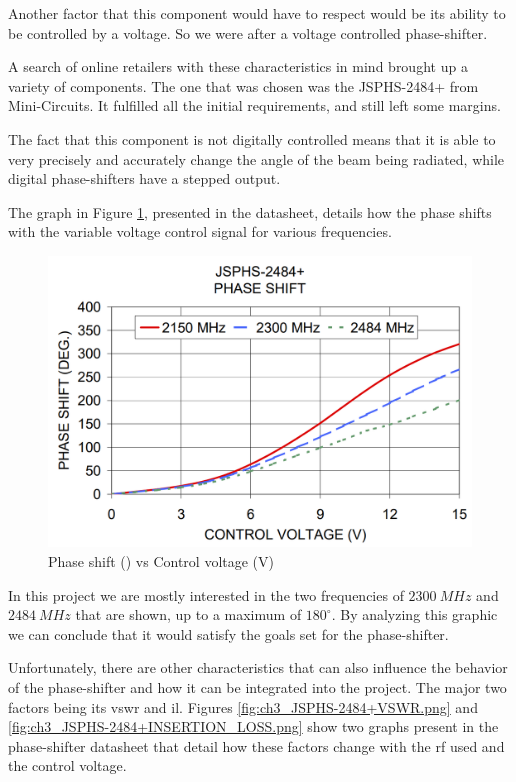 \par Another factor that this component would have to respect would be its ability to be controlled by a voltage. So we were after a voltage controlled phase-shifter.

\par A search of online retailers with these characteristics in mind brought up a variety of components. The one that was chosen was the JSPHS-2484+ from Mini-Circuits. It fulfilled all the initial requirements, and still left some margins.

\par The fact that this component is not digitally controlled means that it is able to very precisely and accurately change the angle of the beam being radiated, while digital phase-shifters have a stepped output.

\par The graph in Figure \ref{fig:ch3_JSPHS-2484+PHASE_SHIFT.png}, presented in the datasheet, details how the phase shifts with the variable voltage control signal for various frequencies.

\begin{figure}[H]
    \vspace*{0cm}
    \centering
    \includegraphics[width=0.6\linewidth]{figs/ch3_JSPHS-2484+PHASE_SHIFT.png}
    \caption{Phase shift (\textdegree) vs Control voltage (V) \cite{PhaseJSPHS-2484+}}
    \label{fig:ch3_JSPHS-2484+PHASE_SHIFT.png}
\end{figure}

\par In this project we are mostly interested in the two frequencies of $2300\:\si{MHz}$ and $2484\:\si{MHz}$ that are shown, up to a maximum of $180^{\circ}$. By analyzing this graphic we can conclude that it would satisfy the goals set for the phase-shifter.

\par Unfortunately, there are other characteristics that can also influence the behavior of the phase-shifter and how it can be integrated into the project. The major two factors  being its \ac{vswr} and \ac{il}. Figures \ref{fig:ch3_JSPHS-2484+VSWR.png} and \ref{fig:ch3_JSPHS-2484+INSERTION_LOSS.png} show two graphs present in the phase-shifter datasheet that detail how these factors change with the \ac{rf} used and the control voltage.

